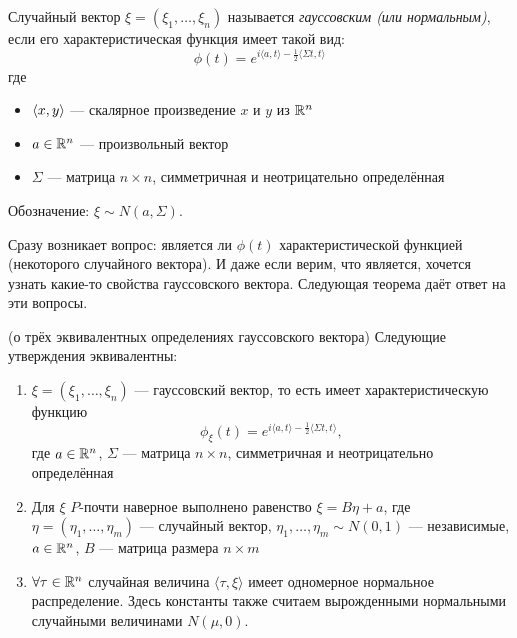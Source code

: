 \begin{definition}
    Случайный вектор $\xi = (\xi_1, \ldots, \xi_n)$ называется \textit{гауссовским (или нормальным)}, если его характеристическая функция имеет такой вид:
    \[
        \phi(t) = e^{i \langle a, t \rangle - \frac{1}{2} \langle \Sigma t, t \rangle}
    \]
    где
    \begin{itemize}
        \item $\left\langle x, y\right\rangle$ --- скалярное произведение $x$ и $y$ из $\mathbb{R}^n$
        
        \item $a \in \mathbb{R}^n$ --- произвольный вектор
        
        \item $\Sigma$ --- матрица $n \times n$, симметричная и неотрицательно определённая
    \end{itemize}
    Обозначение: $\xi \sim N(a, \Sigma)$.
\end{definition}

\begin{note}
    Сразу возникает вопрос: является ли $\phi(t)$ характеристической функцией (некоторого случайного вектора). И даже если верим, что является, хочется узнать какие-то свойства гауссовского вектора. Следующая теорема даёт ответ на эти вопросы.
\end{note}

\begin{theorem} (о трёх эквивалентных определениях гауссовского вектора)
    Следующие утверждения эквивалентны:
    \begin{enumerate}
        \item $\xi = (\xi_1, \ldots, \xi_n)$ --- гауссовский вектор, то есть имеет характеристическую функцию
        \[
            \phi_\xi(t) = e^{i \langle a, t \rangle - \frac{1}{2} \langle \Sigma t, t \rangle},
        \]
        где $a \in \mathbb{R}^n$, $\Sigma$ --- матрица $n \times n$, симметричная и неотрицательно определённая

        \item Для $\xi$ $P$-почти наверное выполнено равенство $\xi = B\eta + a$, где $\eta = (\eta_1, \ldots, \eta_m)$ --- случайный вектор, $\eta_1, \ldots, \eta_m \sim N(0, 1)$ --- независимые, $a \in \mathbb{R}^n$, $B$ --- матрица размера $n \times m$

        \item $\forall \tau \in \mathbb{R}^n$ случайная величина  $\langle \tau, \xi \rangle$ имеет одномерное нормальное распределение. Здесь константы также считаем вырожденными нормальными случайными величинами $N(\mu, 0)$.
    \end{enumerate}
\end{theorem}

